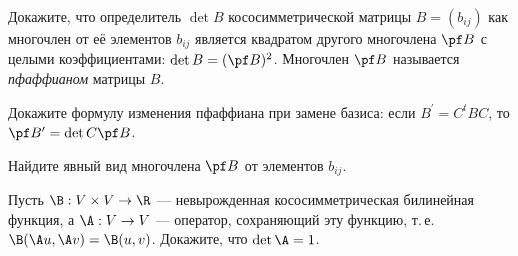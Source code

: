 \begin{problem}
    Докажите, что определитель $\det B$ кососимметрической матрицы $B = (b_{ij})$ как многочлен от её элементов $b_{ij}$ является квадратом другого многочлена $\pf B$ с целыми коэффициентами: $\det B = (\pf B)^2$. Многочлен $\pf B$ называется \textit{пфаффианом} матрицы $B$.
\end{problem}

\begin{problem}
    Докажите формулу изменения пфаффиана при замене базиса: если $B^\prime = C^tBC$, то $\pf B^\prime = \det C\pf B$.
\end{problem}

\begin{problem}
    Найдите явный вид многочлена $\pf B$ от элементов $b_{ij}$.
\end{problem}

\begin{problem}
    Пусть $\B: V \times V \to \R$ --- невырожденная кососимметрическая билинейная функция, а $\A: V \to V$ --- оператор, сохраняющий эту функцию, т.\,е. $\B(\A u, \A v) = \B(u, v)$. Докажите, что $\det\A = 1$.
\end{problem}

